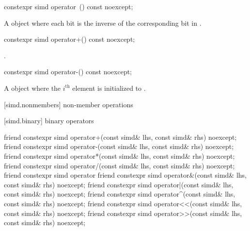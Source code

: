 \begin{itemdecl}
constexpr simd operator~() const noexcept;
\end{itemdecl}

\begin{itemdescr}
  \pnum{}

  \pnum\returns
  A  object where each bit is the inverse of the corresponding bit in .
\end{itemdescr}

\begin{itemdecl}
constexpr simd operator+() const noexcept;
\end{itemdecl}

\begin{itemdescr}
  \pnum{}

  \pnum\returns
  .
\end{itemdescr}

\begin{itemdecl}
constexpr simd operator-() const noexcept;
\end{itemdecl}

\begin{itemdescr}
  \pnum{}

  \pnum\returns
  A  object where the $i^\text{th}$ element is initialized to  \foralli.
\end{itemdescr}

[simd.nonmembers]{ non-member operations}

[simd.binary]{ binary operators}

\begin{itemdecl}
friend constexpr simd operator+(const simd& lhs, const simd& rhs) noexcept;
friend constexpr simd operator-(const simd& lhs, const simd& rhs) noexcept;
friend constexpr simd operator*(const simd& lhs, const simd& rhs) noexcept;
friend constexpr simd operator/(const simd& lhs, const simd& rhs) noexcept;
friend constexpr simd operator%
friend constexpr simd operator&(const simd& lhs, const simd& rhs) noexcept;
friend constexpr simd operator|(const simd& lhs, const simd& rhs) noexcept;
friend constexpr simd operator^(const simd& lhs, const simd& rhs) noexcept;
friend constexpr simd operator<<(const simd& lhs, const simd& rhs) noexcept;
friend constexpr simd operator>>(const simd& lhs, const simd& rhs) noexcept;
\end{itemdecl}

